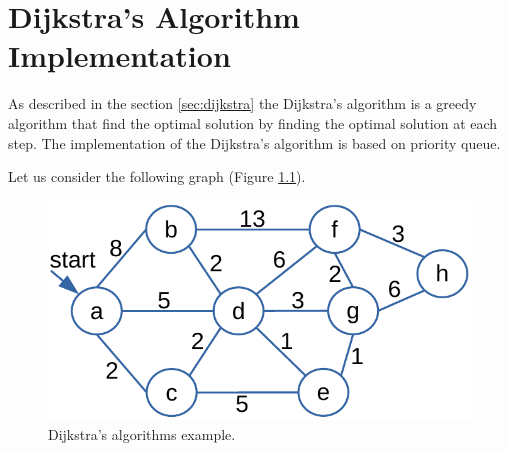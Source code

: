 \chapter{Dijkstra's Algorithm Implementation}
\label{dijkstraimplementation}
As described in the section \ref{sec:dijkstra} the Dijkstra's algorithm is a greedy algorithm that find the optimal solution by finding the optimal solution at each step. The implementation of the Dijkstra's algorithm is based on priority queue.

Let us consider the following graph (Figure \ref{graphappendix_3}).

\begin{figure}[H]
	\begin{center}
		\includegraphics[scale=.6]{chapters/appendix/images/appendixgraphs/graphsappendix_3.pdf}
		\caption[Dijkstra's algorithms example.]{Dijkstra's algorithms example.}
		\label{graphappendix_3}
	\end{center}
\end{figure}

